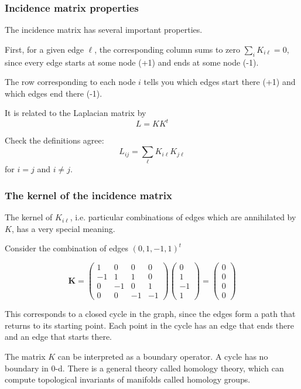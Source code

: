 \documentclass[10pt,aspectratio=169,dvipsnames]{beamer}
\begin{document}
\begin{frame}
  \frametitle{Incidence matrix properties}

  The incidence matrix has several important properties.

  First, for a given edge $\ell$, the corresponding column sums to zero $\sum_{i} K_{i\ell} = 0$, since every edge starts at some node (+1) and ends at some node (-1).

  The row corresponding to each node $i$ tells you which edges start there (+1) and which edges end there (-1).

  It is related to the Laplacian matrix by
  \begin{equation*}
    L = KK^t
  \end{equation*}

  Check the definitions agree:
  \begin{equation*}
    L_{ij} = \sum_\ell K_{i\ell}K_{j\ell}
  \end{equation*}
  for $i=j$ and $i\neq j$.

\end{frame}

\begin{frame}
  \frametitle{The kernel of the incidence matrix}

  The kernel of $K_{i\ell}$, i.e. particular combinations of edges which
  are annihilated by $K$, has a very special meaning.

  Consider the combination of edges $(0,1,-1,1)^t$

  \begin{equation*}
\mathbf{K}=\left(\begin{matrix}
1 & 0 & 0 & 0\\
-1 & 1 & 1 & 0\\
0 & -1 & 0 & 1\\
0 & 0 & -1 & -1
\end{matrix}\right)\left(\begin{matrix}
0 \\
1 \\
-1 \\
1
\end{matrix}\right) = \left(\begin{matrix}
0 \\
0 \\
0 \\
0
\end{matrix}\right)
\end{equation*}

  This corresponds to a \alert{closed cycle} in the graph, since the
  edges form a path that returns to its starting point. Each point in
  the cycle has an edge that ends there and an edge that starts there.

  The matrix $K$ can be interpreted as a \alert{boundary operator}. A
  cycle has no boundary in 0-d. There is a general theory called
  \alert{homology theory}, which can compute topological invariants of
  manifolds called \alert{homology groups}.

\end{frame}
\end{document}

